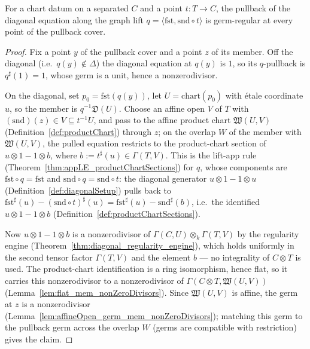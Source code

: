 \begin{theorem}
  \label{thm:graph_pullback_regular}
  \leanok
  For a chart datum on a separated \(C\) and a point \(t \colon T \to C\), the pullback of the
  diagonal equation along the graph lift \(q = \langle \mathrm{fst}, \mathrm{snd} \circ t\rangle\)
  is germ-regular at every point of the pullback cover.
\end{theorem}
\begin{proof}
  \leanok
  Fix a point \(y\) of the pullback cover and a point \(z\) of its member. Off the diagonal (i.e.\
  \(q(y) \notin \Delta\)) the diagonal equation at \(q(y)\) is \(1\), so its \(q\)-pullback is
  \(q^{\sharp}(1) = 1\), whose germ is a unit, hence a nonzerodivisor.

  On the diagonal, set \(p_0 = \mathrm{fst}(q(y))\), let \(U = \mathrm{chart}(p_0)\) with étale
  coordinate \(u\), so the member is \(q^{-1}\mathfrak D(U)\). Choose an affine open \(V\) of \(T\)
  with \((\mathrm{snd})(z) \in V \subseteq t^{-1}U\), and pass to the affine product chart
  \(\mathfrak W(U, V)\) (Definition~\ref{def:productChart}) through \(z\); on the overlap \(W\) of
  the member with \(\mathfrak W(U, V)\), the pulled equation restricts to the product-chart section
  of \(u \otimes 1 - 1 \otimes b\), where \(b := t^{\sharp}(u) \in \Gamma(T, V)\). This is the
  lift-app rule (Theorem~\ref{thm:appLE_productChartSections}) for \(q\), whose components are
  \(\mathrm{fst} \circ q = \mathrm{fst}\) and \(\mathrm{snd} \circ q = \mathrm{snd} \circ t\): the
  diagonal generator \(u \otimes 1 - 1 \otimes u\) (Definition~\ref{def:diagonalSetup}) pulls back
  to \(\mathrm{fst}^{\sharp}(u) - (\mathrm{snd} \circ t)^{\sharp}(u) = \mathrm{fst}^{\sharp}(u) -
  \mathrm{snd}^{\sharp}(b)\), i.e.\ the identified \(u \otimes 1 - 1 \otimes b\)
  (Definition~\ref{def:productChartSections}).

  Now \(u \otimes 1 - 1 \otimes b\) is a nonzerodivisor of \(\Gamma(C, U) \otimes_k \Gamma(T, V)\)
  by the regularity engine (Theorem~\ref{thm:diagonal_regularity_engine}), which holds uniformly in
  the second tensor factor \(\Gamma(T, V)\) and the element \(b\) --- no integrality of \(C \otimes
  T\) is used. The product-chart identification is a ring isomorphism, hence flat, so it carries
  this nonzerodivisor to a nonzerodivisor of \(\Gamma(C \otimes T, \mathfrak W(U, V))\)
  (Lemma~\ref{lem:flat_mem_nonZeroDivisors}). Since \(\mathfrak W(U, V)\) is affine, the germ at
  \(z\) is a nonzerodivisor (Lemma~\ref{lem:affineOpen_germ_mem_nonZeroDivisors}); matching this
  germ to the pullback germ across the overlap \(W\) (germs are compatible with restriction) gives
  the claim.
\end{proof}

